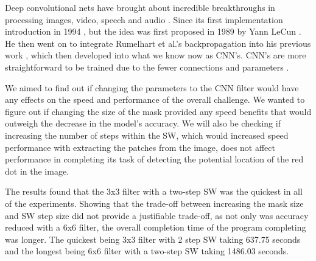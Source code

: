 \documentclass[a4paper,10pt]{article}
\begin{document}
Deep convolutional nets have brought about incredible breakthroughs in processing images, video, speech and audio \cite{lecun2015deep}. Since its first implementation introduction in 1994 \cite{lecun1998gradient}, but the idea was first proposed in 1989 by Yann LeCun \cite{lecun1989generalization}. He then went on to integrate Rumelhart et al.'s \cite{rumelhart1985learning} backpropagation into his previous work \cite{lecun1989backpropagation}, which then developed into what we know now as CNN's. CNN's are more straightforward to be trained due to the fewer connections and parameters \cite{krizhevsky2012imagenet}. 

We aimed to find out if changing the parameters to the CNN filter would have any effects on the speed and performance of the overall challenge. We wanted to figure out if changing the size of the mask provided any speed benefits that would outweigh the decrease in the model's accuracy. We will also be checking if increasing the number of steps within the SW, which would increased speed performance with extracting the patches from the image, does not affect performance in completing its task of detecting the potential location of the red dot in the image.

The results found that the 3x3 filter with a two-step SW was the quickest in all of the experiments. Showing that the trade-off between increasing the mask size and SW step size did not provide a justifiable trade-off, as not only was accuracy reduced with a 6x6 filter, the overall completion time of the program completing was longer. The quickest being 3x3 filter with 2 step SW taking 637.75 seconds and the longest being 6x6 filter with a two-step SW taking 1486.03 seconds. 


\end{document}
